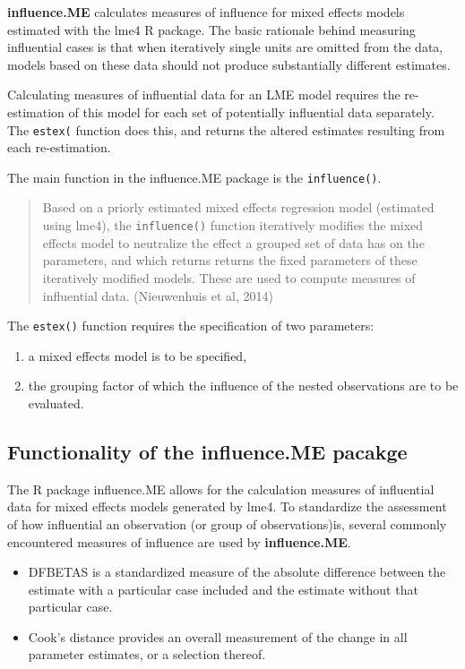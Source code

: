 \documentclass[12pt, a4paper]{article}
\begin{document}
\textbf{influence.ME} calculates measures of influence for mixed effects models estimated with the lme4 R package. The
basic rationale behind measuring influential cases is that when iteratively single units are omitted
from the data, models based on these data should not produce substantially different estimates. 

Calculating measures of influential data for an LME model requires the re-estimation
of this model for each set of potentially influential data separately. The \texttt{estex(} function does this,
and returns the altered estimates resulting from each re-estimation. 

The main function in the influence.ME package is the \texttt{influence()}.

\begin{quote} Based on a priorly estimated
mixed effects regression model (estimated using lme4), the \texttt{influence()} function iteratively modifies
the mixed effects model to neutralize the effect a grouped set of data has on the parameters, and
which returns returns the fixed parameters of these iteratively modified models. These are used to
compute measures of influential data. (Nieuwenhuis et al, 2014)
\end{quote}



The \texttt{estex()} function requires the specification of two parameters: 
\begin{enumerate}
\item a mixed effects model is to be specified,
\item the grouping factor of which the influence of the nested observations are to be evaluated. 
\end{enumerate}


\subsection{Functionality of the influence.ME pacakge}
The R package influence.ME allows for the calculation measures of influential data for mixed effects models generated by lme4. To standardize the assessment of how influential an observation (or group of observations)is, several commonly encountered measures
of influence are used by \textbf{influence.ME}.


\begin{itemize}
\item DFBETAS is a standardized measure of the absolute difference
between the estimate with a particular case included and the estimate without that particular
case. 
\item Cook’s distance provides an overall measurement of the change in all parameter
estimates, or a selection thereof.
\end{itemize}
\end{document}
